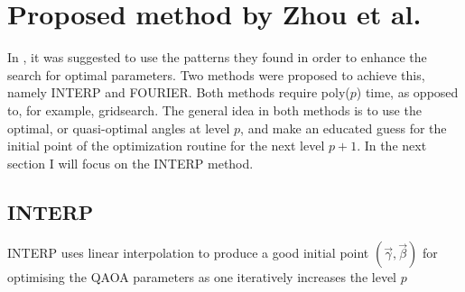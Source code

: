 \section{Proposed method by Zhou et al.}
\label{sec:proposed-methods}
In \cite{ZWCPL18}, it was suggested to use the patterns they found in order to enhance the search for optimal parameters. Two methods were proposed to achieve this, namely INTERP and FOURIER. Both methods require poly($p$) time, as opposed to, for example, gridsearch. The general idea in both methods is to use the optimal, or quasi-optimal angles at level $p$, and make an educated guess for the initial point of the optimization routine for the next level $p+1$. In the next section I will focus on the INTERP method.

\subsection{INTERP}
INTERP uses linear interpolation to produce a good initial point $(\vec{\gamma},\vec{\beta})$ for optimising the QAOA parameters as one iteratively increases the level $p$


